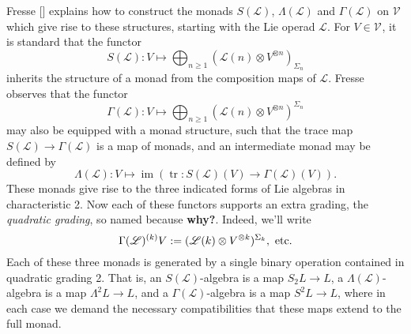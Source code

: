 \documentclass[11pt]{amsart}
\theoremstyle{plain}
\theoremstyle{definition}
\DeclareMathOperator{\im}{im}
\DeclareMathOperator{\trace}{tr}
\renewcommand{\to}{\longrightarrow}
\newcommand{\scrL}{\mathscr{L}}
\newcommand{\calV}{\mathcal{V}}
\theoremstyle{plain}
\newcommand{\LieOperad}{{\scrL}}
\newcommand{\vect}[2]{\calV^{#1}_{#2}}
\begin{document}
\begin{Lie algebras in characteristic 2 and their homotopy operations}
Fresse [] explains how to construct the monads $S(\LieOperad)$, $\Lambda(\LieOperad)$ and $\Gamma(\LieOperad)$ on $\vect{}{}$ which give rise to these structures, starting with the Lie operad $\LieOperad$. For $V\in\vect{}{}$, it is standard that the functor
\[S(\LieOperad):V\mapsto \bigoplus_{n\geq1}(\LieOperad(n)\otimes V^{\otimes n})_{\Sigma_n}\]
inherits the structure of a monad from the composition maps of $\LieOperad$. Fresse observes that the functor
\[\Gamma(\LieOperad):V\mapsto \bigoplus_{n\geq1}(\LieOperad(n)\otimes V^{\otimes n})^{\Sigma_n}\]
may also be equipped with a monad structure, such that the trace map $S(\LieOperad)\to \Gamma(\LieOperad)$
is a map of monads, and an intermediate monad may be defined by
\[\Lambda(\LieOperad):V\mapsto\im(\trace:S(\LieOperad)(V)\to \Gamma(\LieOperad)(V)).\]
These monads give rise to the three indicated forms of Lie algebras in characteristic 2. Now each of these functors supports an extra grading, the \emph{quadratic grading}, so named because \textbf{why?}. Indeed, we'll write
\[\Gamma(\LieOperad)^{(k)}V:=(\LieOperad(k)\otimes V^{\otimes k})^{\Sigma_k},\textup{ etc}.\]
Each of these three monads is generated by a single binary operation contained in quadratic grading 2. That is, an $S(\LieOperad)$-algebra is a map $S_2L\to L$, a $\Lambda(\LieOperad)$-algebra is a map $\Lambda^2L\to L$, and a $\Gamma(\LieOperad)$-algebra is a map $S^2L\to L$, where in each case we demand the necessary compatibilities that these maps extend to the full monad. %


\end{Lie algebras in characteristic 2 and their homotopy operations}
\end{document}
